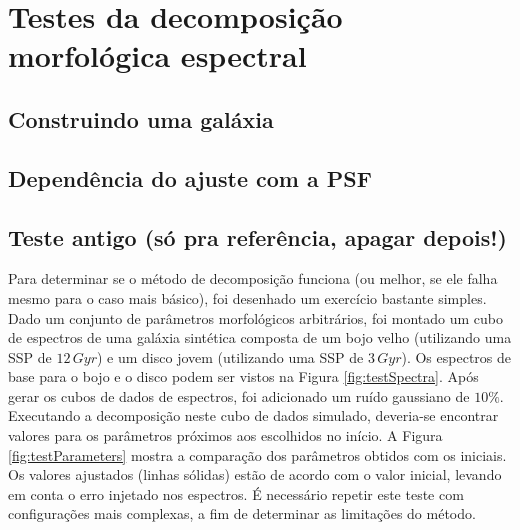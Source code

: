 


\chapter{Testes da decomposição morfológica espectral}

\section{Construindo uma galáxia}

\section{Dependência do ajuste com  a PSF}
\label{sec:test:psf}

\section{Teste antigo (só pra referência, apagar depois!)}

Para determinar se o método de decomposição funciona (ou melhor, se ele falha
mesmo para o caso mais básico), foi desenhado um exercício bastante simples.
Dado um conjunto de parâmetros morfológicos arbitrários, foi montado um cubo de
espectros de uma galáxia sintética composta de um bojo velho (utilizando uma SSP
de $12\,Gyr$) e um disco jovem (utilizando uma SSP de $3\,Gyr$). Os espectros de
base para o bojo e o disco podem ser vistos na Figura \ref{fig:testSpectra}.
Após gerar os cubos de dados de espectros, foi adicionado um ruído gaussiano de
$10\%$. Executando a decomposição neste cubo de dados simulado, deveria-se
encontrar valores para os parâmetros próximos aos escolhidos no início. A Figura
\ref{fig:testParameters} mostra a comparação dos parâmetros obtidos com os
iniciais. Os valores ajustados (linhas sólidas) estão de acordo com o valor
inicial, levando em conta o erro injetado nos espectros. É necessário repetir
este teste com configurações mais complexas, a fim de determinar as limitações
do método.


